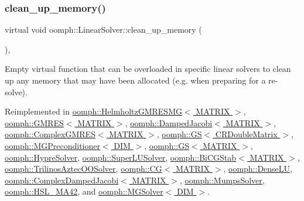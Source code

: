 \subsubsection{\texorpdfstring{clean\+\_\+up\+\_\+memory()}{clean\_up\_memory()}}
{\footnotesize\ttfamily virtual void oomph\+::\+Linear\+Solver\+::clean\+\_\+up\+\_\+memory (\begin{DoxyParamCaption}{ }\end{DoxyParamCaption})\hspace{0.3cm}{\ttfamily [inline]}, {\ttfamily [virtual]}}



Empty virtual function that can be overloaded in specific linear solvers to clean up any memory that may have been allocated (e.\+g. when preparing for a re-\/solve). 



Reimplemented in \hyperlink{classoomph_1_1HelmholtzGMRESMG_a81ddd10ccc03d6582dcadbd5cae1edda}{oomph\+::\+Helmholtz\+G\+M\+R\+E\+S\+M\+G$<$ M\+A\+T\+R\+I\+X $>$}, \hyperlink{classoomph_1_1GMRES_a5593b936e70b6668758bb94f4097b9b1}{oomph\+::\+G\+M\+R\+E\+S$<$ M\+A\+T\+R\+I\+X $>$}, \hyperlink{classoomph_1_1DampedJacobi_a959c1fcafae700e8735f7100fd3670f1}{oomph\+::\+Damped\+Jacobi$<$ M\+A\+T\+R\+I\+X $>$}, \hyperlink{classoomph_1_1ComplexGMRES_a946b88bc1392180c56909b739bfa7b3c}{oomph\+::\+Complex\+G\+M\+R\+E\+S$<$ M\+A\+T\+R\+I\+X $>$}, \hyperlink{classoomph_1_1GS_3_01CRDoubleMatrix_01_4_a6e5470c508a10e89dd110463c7cea89a}{oomph\+::\+G\+S$<$ C\+R\+Double\+Matrix $>$}, \hyperlink{classoomph_1_1MGPreconditioner_acc92bd3f8c9b729283d35c1f4ae37dd2}{oomph\+::\+M\+G\+Preconditioner$<$ D\+I\+M $>$}, \hyperlink{classoomph_1_1GS_a7dcf28fef43088ead0e662a32275b383}{oomph\+::\+G\+S$<$ M\+A\+T\+R\+I\+X $>$}, \hyperlink{classoomph_1_1HypreSolver_a5c1a57f1f74c0748a47c1629635ee0fc}{oomph\+::\+Hypre\+Solver}, \hyperlink{classoomph_1_1SuperLUSolver_aec78b96a8f831a89f9b8fb48b1ce0c68}{oomph\+::\+Super\+L\+U\+Solver}, \hyperlink{classoomph_1_1BiCGStab_a6c97b794a4bec6a22df28f5f160577be}{oomph\+::\+Bi\+C\+G\+Stab$<$ M\+A\+T\+R\+I\+X $>$}, \hyperlink{classoomph_1_1TrilinosAztecOOSolver_a365a39ae1dec32eb78aa160b70426f59}{oomph\+::\+Trilinos\+Aztec\+O\+O\+Solver}, \hyperlink{classoomph_1_1CG_ab51014aac249e9998a002509c7a3088e}{oomph\+::\+C\+G$<$ M\+A\+T\+R\+I\+X $>$}, \hyperlink{classoomph_1_1DenseLU_a5d4d454874476adadb3bc23913b1190b}{oomph\+::\+Dense\+LU}, \hyperlink{classoomph_1_1ComplexDampedJacobi_a4e246d712c8eb9e4db05f859148784d3}{oomph\+::\+Complex\+Damped\+Jacobi$<$ M\+A\+T\+R\+I\+X $>$}, \hyperlink{classoomph_1_1MumpsSolver_adc1541e4a9cbbe9c641f988380618713}{oomph\+::\+Mumps\+Solver}, \hyperlink{classoomph_1_1HSL__MA42_a81487397ec92afb883f0a95beb99aff0}{oomph\+::\+H\+S\+L\+\_\+\+M\+A42}, and \hyperlink{classoomph_1_1MGSolver_a85e3e6f32b4e77d696d5b001e1428f08}{oomph\+::\+M\+G\+Solver$<$ D\+I\+M $>$}.



